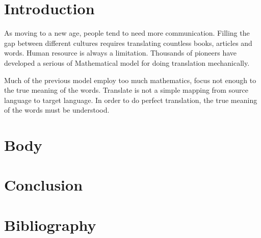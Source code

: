 \section{Introduction}

As moving to a new age, people tend to need more communication. Filling the gap between different cultures requires translating countless books, articles and words. Human resource is always a limitation. Thousands of 
pioneers have developed a serious of Mathematical model for doing translation mechanically. 

Much of the previous model employ too much mathematics, focus not enough to the true meaning of the words.
Translate is not a simple mapping from source language to target language. In order to do perfect translation,
the true meaning of the words must be understood. 


\section{Body}
\section{Conclusion}
\section{Bibliography}